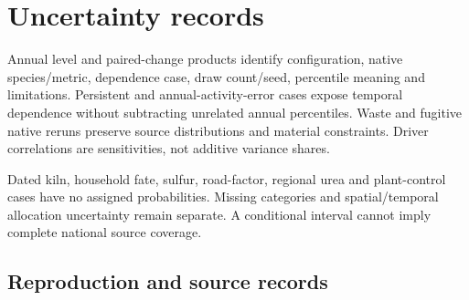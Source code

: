 \documentclass[a4paper,11pt]{article}
\newcommand{\pkinvDemoteFragment}{\begingroup
  \let\section\subsection
  \let\subsection\subsubsection}
\newcommand{\pkinvEndFragment}{\endgroup}
\begin{document}
\section{Uncertainty records}\label{sup:keycat}
Annual level and paired-change products identify configuration, native species/metric, dependence case, draw count/seed, percentile meaning and limitations. Persistent and annual-activity-error cases expose temporal dependence without subtracting unrelated annual percentiles. Waste and fugitive native reruns preserve source distributions and material constraints. Driver correlations are sensitivities, not additive variance shares.

Dated kiln, household fate, sulfur, road-factor, regional urea and plant-control cases have no assigned probabilities. Missing categories and spatial/temporal allocation uncertainty remain separate. A conditional interval cannot imply complete national source coverage.

\pkinvDemoteFragment

\pkinvEndFragment

\section{Reproduction and source records}\label{sup:reproduction}
\pkinvDemoteFragment

\pkinvEndFragment



\end{document}
